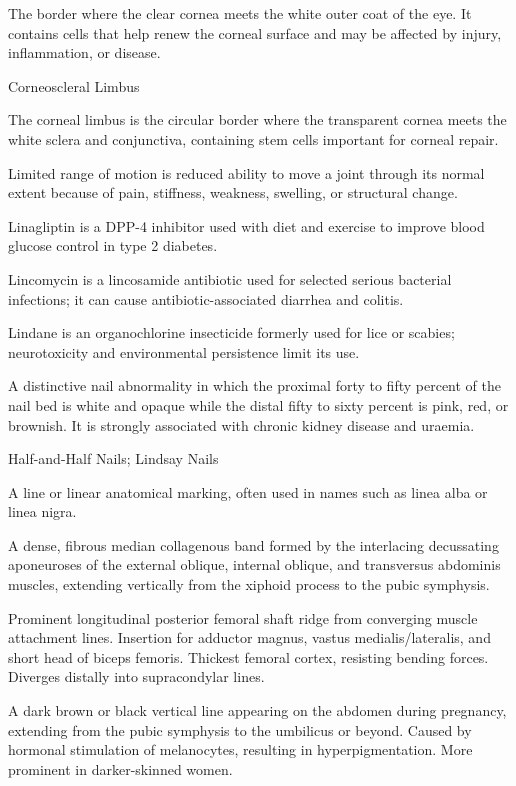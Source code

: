  The border where the clear cornea meets the white outer coat of the eye. It contains cells that help renew the corneal surface and may be affected by injury, inflammation, or disease.

\synonyms
Corneoscleral Limbus

 The corneal limbus is the circular border where the transparent cornea meets the white sclera and conjunctiva, containing stem cells important for corneal repair.

 Limited range of motion is reduced ability to move a joint through its normal extent because of pain, stiffness, weakness, swelling, or structural change.

 Linagliptin is a DPP-4 inhibitor used with diet and exercise to improve blood glucose control in type 2 diabetes.

 Lincomycin is a lincosamide antibiotic used for selected serious bacterial infections; it can cause antibiotic-associated diarrhea and colitis.

 Lindane is an organochlorine insecticide formerly used for lice or scabies; neurotoxicity and environmental persistence limit its use.

 A distinctive nail abnormality in which the proximal forty to fifty percent of the nail bed is white and opaque while the distal fifty to sixty percent is pink, red, or brownish. It is strongly associated with chronic kidney disease and uraemia.

\synonyms
Half-and-Half Nails; Lindsay Nails

 A line or linear anatomical marking, often used in names such as linea alba or linea nigra.

 A dense, fibrous median collagenous band formed by the interlacing decussating aponeuroses of the external oblique, internal oblique, and transversus abdominis muscles, extending vertically from the xiphoid process to the pubic symphysis.

 Prominent longitudinal posterior femoral shaft ridge from converging muscle attachment
lines. Insertion for adductor magnus, vastus medialis/lateralis, and short head of
biceps femoris. Thickest femoral cortex, resisting bending forces. Diverges distally
into supracondylar lines.

 A dark brown or black vertical line appearing on the abdomen during pregnancy, extending
from the pubic symphysis to the umbilicus or beyond. Caused by hormonal stimulation of
melanocytes, resulting in hyperpigmentation. More prominent in darker-skinned women.

